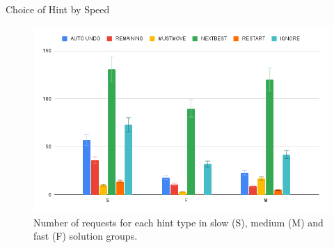 \begin{frame}{Choice of Hint by Speed}
\begin{figure}[tpb]
  \centering
\includegraphics[width=0.8\columnwidth]{../img/speedreq.png}
  \caption{Number of requests for each hint type in slow (S), medium (M) and fast (F) solution groups.}
\end{figure}
\end{frame}